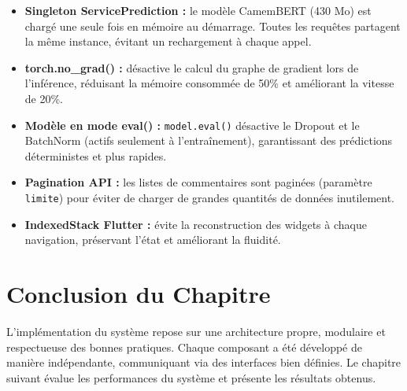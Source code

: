 \begin{itemize}
  \item \textbf{Singleton ServicePrediction :} le modèle CamemBERT (430 Mo)
        est chargé une seule fois en mémoire au démarrage. Toutes les requêtes
        partagent la même instance, évitant un rechargement à chaque appel.

  \item \textbf{torch.no\_grad() :} désactive le calcul du graphe de
        gradient lors de l'inférence, réduisant la mémoire consommée de
        50\% et améliorant la vitesse de 20\%.

  \item \textbf{Modèle en mode eval() :} \texttt{model.eval()} désactive
        le Dropout et le BatchNorm (actifs seulement à l'entraînement),
        garantissant des prédictions déterministes et plus rapides.

  \item \textbf{Pagination API :} les listes de commentaires sont paginées
        (paramètre \texttt{limite}) pour éviter de charger de grandes quantités
        de données inutilement.

  \item \textbf{IndexedStack Flutter :} évite la reconstruction des widgets
        à chaque navigation, préservant l'état et améliorant la fluidité.
\end{itemize}

\section*{Conclusion du Chapitre}

L'implémentation du système repose sur une architecture propre, modulaire
et respectueuse des bonnes pratiques. Chaque composant a été développé de
manière indépendante, communiquant via des interfaces bien définies.
Le chapitre suivant évalue les performances du système et présente les
résultats obtenus.

\cleardoublepage
